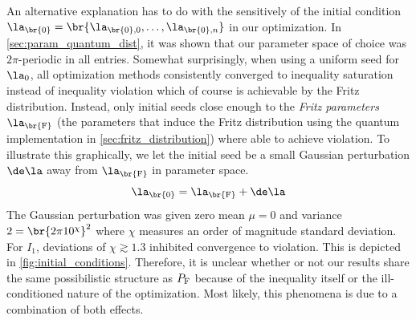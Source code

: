 \documentclass[aps, 10pt, english, twoside, pra, nofootinbib, tightenlines, longbibliography]{revtex4-1}
\begin{document}
    An alternative explanation has to do with the sensitively of the initial condition $\la_{\br{0}} = \br{\la_{\br{0}, 0}, \ldots, \la_{\br{0}, n}}$ in our optimization. In \cref{sec:param_quantum_dist}, it was shown that our parameter space of choice was $2\pi$-periodic in all entries. Somewhat surprisingly, when using a uniform seed for $\la_0$, all optimization methods consistently converged to inequality saturation instead of inequality violation which of course is achievable by the Fritz distribution. Instead, only initial seeds close enough to the \textit{Fritz parameters} $\la_{\br{\fritz}}$ (the parameters that induce the Fritz distribution using the quantum implementation in \cref{sec:fritz_distribution}) where able to achieve violation. To illustrate this graphically, we let the initial seed be a small Gaussian perturbation $\de \la$ away from $\la_{\br{\fritz}}$ in parameter space.
    \[ \la_{\br{0}} = \la_{\br{\fritz}} + \de \la  \]
    The Gaussian perturbation was given zero mean $\mu = 0$ and variance $\si^2 = \br{2 \pi 10^{\chi}}^2$ where $\chi$ measures an order of magnitude standard deviation. For $I_1$, deviations of $\chi \gtrsim 1.3$ inhibited convergence to violation. This is depicted in \cref{fig:initial_conditions}. Therefore, it is unclear whether or not our results share the same possibilistic structure as $\prob[\fritz]$ because of the inequality itself or the ill-conditioned nature of the optimization. Most likely, this phenomena is due to a combination of both effects.
\end{document}
